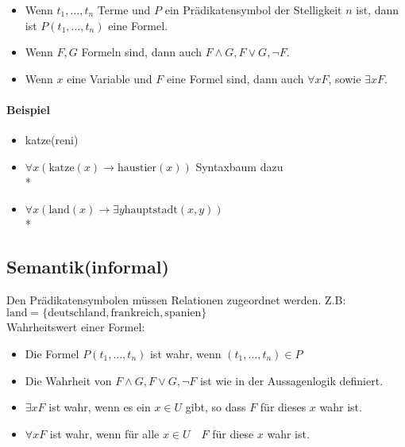 \documentclass[a4paper]{scrartcl}
\begin{document}
\begin{itemize}
\item Wenn $t_1,\dots,t_n$ Terme und $P$ ein Prädikatensymbol der Stelligkeit $n$ ist, dann ist $P(t_1,\dots,t_n)$ eine Formel.
\item Wenn $F,G$ Formeln sind, dann auch $F \wedge G, F\vee G, \neg F$.
\item Wenn $x$ eine Variable und $F$ eine Formel sind, dann auch $\forall x F$, sowie $\exists x F$.
\end{itemize}
\paragraph{Beispiel} 
\begin{itemize}
\item katze(reni)
\item $\forall x (\text{katze}(x) \rightarrow \text{haustier}(x)) $
Syntaxbaum dazu \\* 
\item $\forall x(\text{land}(x) \rightarrow \exists y \text{hauptstadt}(x,y))$ \\*
\end{itemize}

\subsection{Semantik(informal)} Den Prädikatensymbolen müssen Relationen zugeordnet werden. Z.B: $\text{land} = \{\text{deutschland},\text{frankreich},\text{spanien}\}$\\
Wahrheitswert einer Formel:
\begin{itemize}
\item Die Formel $P(t_1,\dots,t_n)$ ist wahr, wenn $(t_1,\dots,t_n) \in P$
\item Die Wahrheit von $F \wedge G, F \vee G, \neg F$ ist wie in der Aussagenlogik definiert.
\item $\exists xF$ ist wahr, wenn es ein $x \in U$ gibt, so dass $F$ für dieses $x$ wahr ist.
\item $\forall xF$ ist wahr, wenn für alle $x \in U \quad F$ für diese $x$ wahr ist.
\end{itemize}
\end{document}
